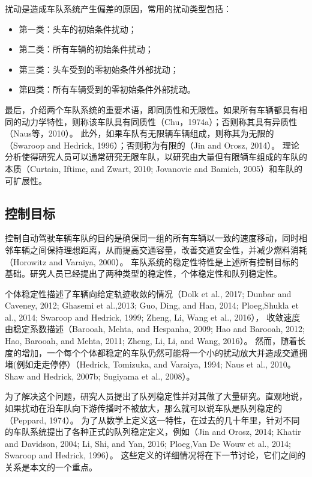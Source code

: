 \begin{translation}
扰动是造成车队系统产生偏差的原因，常用的扰动类型包括：
\begin{itemize}
  \item 第一类：头车的初始条件扰动；
  \item 第二类：所有车辆的初始条件扰动；
  \item 第三类：头车受到的零初始条件外部扰动；
  \item 第四类：所有车辆受到的零初始条件外部扰动。
\end{itemize}


最后，介绍两个车队系统的重要术语，即同质性和无限性。如果所有车辆都具有相同的动力学特性，则称该车队具有同质性（Chu，1974a）；否则称其具有异质性（Naus等，2010）。
此外，如果车队有无限辆车辆组成，则称其为无限的（Swaroop and Hedrick, 1996）；否则称为有限的（Jin and Orosz, 2014）。
理论分析使得研究人员可以通常研究无限车队，以研究由大量但有限辆车组成的车队的本质（Curtain, Iftime, and Zwart, 2010; Jovanovic and Bamieh, 2005）和车队的可扩展性。

\subsection{控制目标}

控制自动驾驶车辆车队的目的是确保同一组的所有车辆以一致的速度移动，同时相邻车辆之间保持理想距离，从而提高交通容量，改善交通安全性，并减少燃料消耗（Horowitz and Varaiya, 2000）。
车队系统的稳定性特性是上述所有控制目标的基础。研究人员已经提出了两种类型的稳定性，个体稳定性和队列稳定性。

个体稳定性描述了车辆向给定轨迹收敛的情况（Dolk et al., 2017; Dunbar and Caveney, 2012; Ghasemi et al.,2013; Guo, Ding, and Han, 2014; Ploeg,Shukla et al., 2014; Swaroop and Hedrick, 1999; Zheng, Li, Wang et al., 2016），
收敛速度由稳定系数描述（Barooah, Mehta, and Hespanha, 2009; Hao and Barooah, 2012; Hao, Barooah, and Mehta, 2011; Zheng, Li, Li, and Wang, 2016）。
然而，随着长度的增加，一个每个个体都稳定的车队仍然可能将一个小的扰动放大并造成交通拥堵(例如走走停停）（Hedrick, Tomizuka, and Varaiya, 1994; Naus et al., 2010。 Shaw and Hedrick, 2007b; Sugiyama et al., 2008）。

为了解决这个问题，研究人员提出了队列稳定性并对其做了大量研究。直观地说，如果扰动在沿车队向下游传播时不被放大，那么就可以说车队是队列稳定的（Peppard, 1974）。
为了从数学上定义这一特性，在过去的几十年里，针对不同的车队系统提出了各种正式的队列稳定定义，例如（Jin and Orosz, 2014; Khatir and Davidson, 2004; Li, Shi, and Yan, 2016; Ploeg,Van De Wouw et al., 2014; Swaroop and Hedrick, 1996）。
这些定义的详细情况将在下一节讨论，它们之间的关系是本文的一个重点。


\end{translation}
